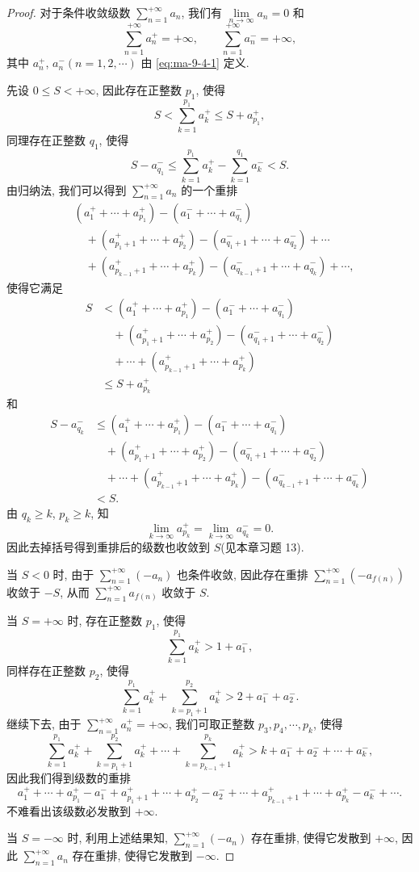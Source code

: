 \begin{proof}
对于条件收敛级数 $\sum\limits_{n=1}^{+\infty}a_n$, 我们有 $\lim\limits_{n\to\infty}a_n=0$ 和
\[
  \sum_{n=1}^{+\infty}a_n^+=+\infty,\qquad \sum_{n=1}^{+\infty}a_n^-=+\infty,
\]
其中 $a_n^+$, $a_n^-(n=1,2,\cdots)$ 由 \eqref{eq:ma-9-4-1} 定义.

先设 $0\leq S<+\infty$, 因此存在正整数 $p_1$, 使得
\[
  S<\sum_{k=1}^{p_1}a_k^+\leq S+a_{p_1}^+,
\]
同理存在正整数 $q_1$, 使得
\[
  S-a_{q_1}^-\leq\sum_{k=1}^{p_1}a_k^+-\sum_{k=1}^{q_1}a_k^-<S.
\]
由归纳法, 我们可以得到 $\sum\limits_{n=1}^{+\infty}a_n$ 的一个重排
\[
\begin{aligned}
  &(a_1^++\cdots+a_{p_1}^+)-(a_1^-+\cdots+a_{q_1}^-)\\
  &\quad +(a_{p_1+1}^++\cdots+a_{p_2}^+)-(a_{q_1+1}^-+\cdots+a_{q_2}^-)+\cdots\\
  &\quad +(a_{p_{k-1}+1}^++\cdots+a_{p_k}^+)-(a_{q_{k-1}+1}^-+\cdots+a_{q_k}^-)+\cdots,
\end{aligned}
\]
使得它满足
\[
\begin{aligned}
  S
  &< (a_1^++\cdots+a_{p_1}^+)-(a_1^-+\cdots+a_{q_1}^-)\\
  &\quad +(a_{p_1+1}^++\cdots+a_{p_2}^+)-(a_{q_1+1}^-+\cdots+a_{q_2}^-)\\
  &\quad +\cdots+(a_{p_{k-1}+1}^++\cdots+a_{p_k}^+)\\
  &\leq S+a_{p_k}^+
\end{aligned}
\]
和
\[
\begin{aligned}
  S-a_{q_k}^-
  &\leq (a_1^++\cdots+a_{p_1}^+)-(a_1^-+\cdots+a_{q_1}^-)\\
  &\quad +(a_{p_1+1}^++\cdots+a_{p_2}^+)-(a_{q_1+1}^-+\cdots+a_{q_2}^-)\\
  &\quad +\cdots+(a_{p_{k-1}+1}^++\cdots+a_{p_k}^+)-(a_{q_{k-1}+1}^-+\cdots+a_{q_k}^-)\\
  &<S.
\end{aligned}
\]
由 $q_k\geq k$, $p_k\geq k$, 知
\[
  \lim_{k\to\infty}a_{p_k}^+=\lim_{k\to\infty}a_{q_k}^-=0.
\]
因此去掉括号得到重排后的级数也收敛到 $S$(见本章习题 13).

当 $S<0$ 时, 由于 $\sum\limits_{n=1}^{+\infty}(-a_n)$ 也条件收敛, 因此存在重排 $\sum\limits_{n=1}^{+\infty}(-a_{f(n)})$ 收敛于 $-S$, 从而 $\sum\limits_{n=1}^{+\infty}a_{f(n)}$ 收敛于 $S$.

当 $S=+\infty$ 时, 存在正整数 $p_1$, 使得
\[
  \sum_{k=1}^{p_1}a_k^+>1+a_1^-,
\]
同样存在正整数 $p_2$, 使得
\[
  \sum_{k=1}^{p_1}a_k^++\sum_{k=p_1+1}^{p_2}a_k^+>2+a_1^-+a_2^-.
\]
继续下去, 由于 $\sum\limits_{n=1}^{+\infty}a_n^+=+\infty$, 我们可取正整数 $p_3,p_4,\cdots,p_k$, 使得
\[
  \sum_{k=1}^{p_1}a_k^++\sum_{k=p_1+1}^{p_2}a_k^++\cdots+\sum_{k=p_{k-1}+1}^{p_k}a_k^+
  > k+a_1^-+a_2^-+\cdots+a_k^-,
\]
因此我们得到级数的重排
\[
  a_1^++\cdots+a_{p_1}^+-a_1^-+a_{p_1+1}^++\cdots+a_{p_2}^+-a_2^-+\cdots
  +a_{p_{k-1}+1}^++\cdots+a_{p_k}^+-a_k^-+\cdots.
\]
不难看出该级数必发散到 $+\infty$.

当 $S=-\infty$ 时, 利用上述结果知, $\sum\limits_{n=1}^{+\infty}(-a_n)$ 存在重排, 使得它发散到 $+\infty$, 因此 $\sum\limits_{n=1}^{+\infty}a_n$ 存在重排, 使得它发散到 $-\infty$.
\end{proof}


